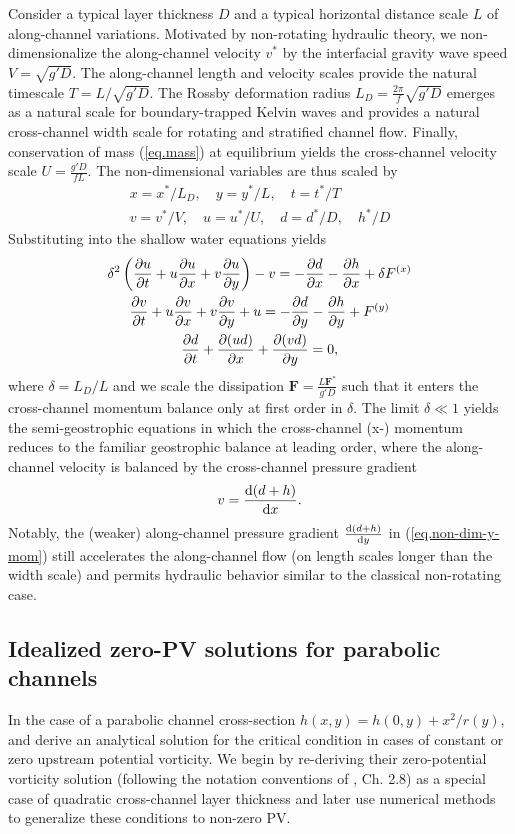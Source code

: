 \documentclass{jfm}
\begin{document}
Consider a typical layer thickness $D$ and a typical horizontal distance scale $L$ of along-channel variations. Motivated by non-rotating hydraulic theory, we non-dimensionalize the along-channel velocity $v^*$ by the interfacial gravity wave speed $V = \sqrt{g'D}$. The along-channel length and velocity scales provide the natural timescale $T = L/\sqrt{g'D}$. The Rossby deformation radius $L_{D} = \frac{2\pi}{f} \sqrt{g'D}$ emerges as a natural scale for boundary-trapped Kelvin waves and provides a natural cross-channel width scale for rotating and stratified channel flow. Finally, conservation of mass (\ref{eq.mass}) at equilibrium yields the cross-channel velocity scale $U = \frac{g'D}{fL}$. The non-dimensional variables are thus scaled by
\begin{gather}
x = x^* / L_{D}, \quad y = y^* / L, \quad t = t^* / T\\
v = v^* / V, \quad u = u^* / U, \quad d = d^* / D, \quad h^* / D
\end{gather}
Substituting into the shallow water equations yields
\begin{gather}
    \delta^2 \left( \pdv{u}{t} + u\pdv{u}{x} + v\pdv{u}{y} \right) -v = - \pdv{d}{x} - \pdv{h}{x} + \delta F^{(x)} \label{eq.non-dim-x-mom}\\
    \pdv{v}{t} + u \pdv{v}{x} + v \pdv{v}{y} + u = - \pdv{d}{y} - \pdv{h}{y} + F^{(y)}\label{eq.non-dim-y-mom} \\
    \pdv{d}{t} + \pdv{(u d)}{x} + \pdv{(v d)}{y} = 0,
\end{gather}
where $\delta = L_{D}/L$ and we scale the dissipation $\mathbf{F} = \frac{L \mathbf{F}^*}{g' D}$ such that it enters the cross-channel momentum balance only at first order in $\delta$. The limit $\delta \ll 1$ yields the semi-geostrophic equations in which the cross-channel (x-) momentum reduces to the familiar geostrophic balance at leading order, where the along-channel velocity is balanced by the cross-channel pressure gradient
\begin{equation}
    v = \dv{(d + h)}{x}.
\end{equation}
Notably, the (weaker) along-channel pressure gradient $\dv{(d + h)}{y}$ in (\ref{eq.non-dim-y-mom}) still accelerates the along-channel flow (on length scales longer than the width scale) and permits hydraulic behavior similar to the classical non-rotating case.
\subsection{Idealized zero-PV solutions for parabolic channels}
In the case of a parabolic channel cross-section $h(x,y)=h(0,y) + x^{2}/r(y)$, \cite{Borenas1986} and \cite{borenas_deep-water_1988} derive an analytical solution for the critical condition in cases of constant or zero upstream potential vorticity. We begin by re-deriving their zero-potential vorticity solution (following the notation conventions of \citealt{Pratt2007}, Ch. 2.8) as a special case of quadratic cross-channel layer thickness and later use numerical methods to generalize these conditions to non-zero PV.
\end{document}
